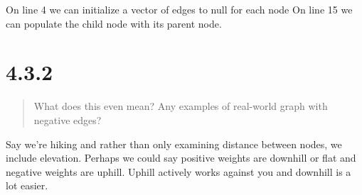 \documentclass[12pt, letterpaper, twoside]{article}
\begin{document}
On line 4 we can initialize a vector of edges to null for each node
On line 15 we can populate the child node with its parent node.

\section*{4.3.2}

\begin{quote}
What does this even mean? Any examples of real-world graph with negative edges?
\end{quote}

Say we're hiking and rather than only examining distance between nodes, we include elevation. 
Perhaps we could say positive weights are downhill or flat and negative weights are uphill.
Uphill actively works against you and downhill is a lot easier.
\end{document}

